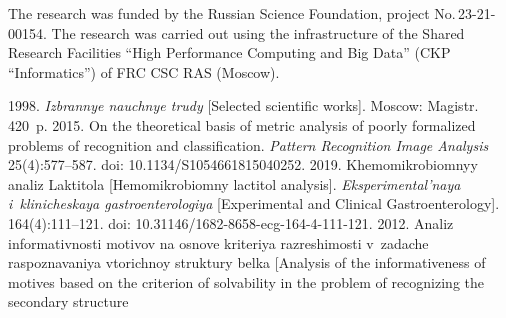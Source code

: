 



\vspace*{-18pt}

\Ack
\noindent
The research was funded by the Russian Science Foundation, project No.\,23-21-00154. The 
research was carried out using the infrastructure of the Shared Research Facilities ``High 
Performance Computing and Big Data'' (CKP ``Informatics'') of FRC CSC RAS (Moscow).
  

\vspace*{6pt}

  \begin{multicols}{2}

\renewcommand{\bibname}{\protect\rmfamily References}

{\small\frenchspacing
 {%
 \begin{thebibliography}{9} 
 1998. \textit{Iz\-bran\-nye na\-uch\-nye trudy} [Selected scientific works]. 
Moscow: Magistr. 420~p.
 2015. On the theoretical basis of metric analysis of 
poorly formalized problems of recognition and classification. \textit{Pattern Recognition Image 
Analysis} 25(4):577--587. doi: 10.1134/S1054661815040252.
 2019. 
 Khe\-mo\-mik\-ro\-biom\-nyy ana\-liz Lak\-ti\-to\-la [Hemomikrobiomny lactitol analysis]. 
\textit{Eks\-pe\-ri\-men\-tal'\-naya i~kli\-ni\-che\-skaya gast\-ro\-en\-te\-ro\-lo\-giya} [Experimental and Clinical 
Gastroenterology]. 164(4):111--121. doi: 10.31146/1682-8658-ecg-164-4-111-121.
 2012. Ana\-liz in\-for\-ma\-tiv\-nosti mo\-ti\-vov 
na osno\-ve kri\-te\-riya raz\-re\-shi\-mosti v~za\-da\-che ras\-po\-zna\-va\-niya vto\-rich\-noy 
struk\-tu\-ry bel\-ka [Analysis of the informativeness of motives based on the criterion of 
solvability in the problem of recognizing the secondary structure\linebreak\vspace*{-12pt}

\columnbreak


\end{thebibliography}}}
\end{multicols}
